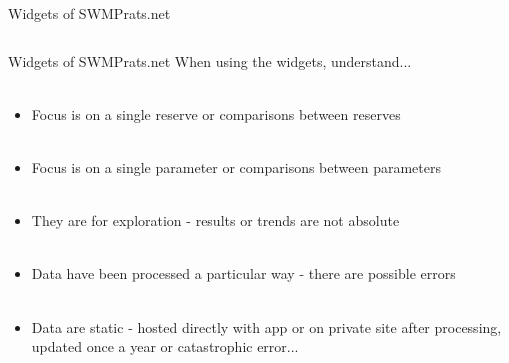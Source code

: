 \documentclass[xcolor=dvipsnames,serif]{beamer}\usepackage[]{graphicx}\usepackage[]{color}
\begin{document}
\begin{frame}{Widgets of SWMPrats.net}
\begin{columns}
\begin{column}{0.3\textwidth}
\end{column}
\begin{column}{0.3\textwidth}
\centerline{}
\end{column}
\end{columns}
\end{frame}

\begin{frame}{Widgets of SWMPrats.net}
When using the widgets, understand... \\~\\
\begin{itemize}
\item Focus is on a single reserve or comparisons between reserves \\~\\
\item Focus is on a single parameter or comparisons between parameters \\~\\
\item They are for exploration - results or trends are not absolute \\~\\
\item Data have been processed a particular way - there are possible errors \\~\\
\item Data are static - hosted  directly with app or on private site after processing, updated once a year or catastrophic error...
\end{itemize}
\end{frame}
\end{document}

